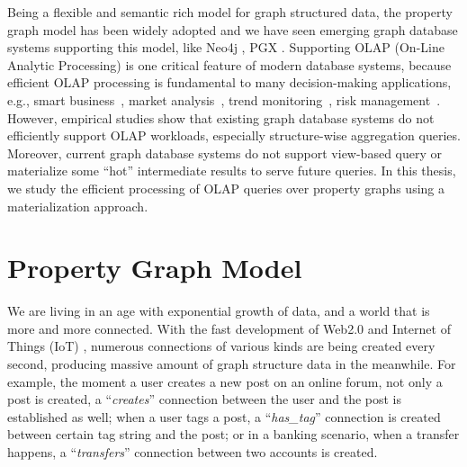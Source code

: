 

Being a flexible and semantic rich model for graph structured data, the property graph model has been widely adopted and we have seen emerging graph database systems supporting this model, like Neo4j \cite{DBLP:conf/oopsla/Webber12}, PGX \cite{DBLP:conf/sc/HongDMLVC15}. Supporting OLAP (On-Line Analytic Processing) is one critical feature of modern database systems, because efficient OLAP processing is fundamental to many decision-making applications, e.g., smart business~\cite{Petermann:2014:GDI:2733004.2733034}, market analysis~\cite{DBLP:journals/corr/LamSG16}, trend monitoring~\cite{DBLP:journals/tii/FangXZAPYL14}, risk management~\cite{DBLP:journals/tcyb/ChoiCY17}. However, empirical studies show that existing graph database systems do not efficiently support OLAP workloads, especially structure-wise aggregation queries. Moreover, current graph database systems do not support view-based query or materialize some ``hot'' intermediate results to serve future queries. In this thesis, we study the efficient processing of OLAP queries over property graphs  using a materialization approach.


\section{Property Graph Model}
\label{s:1}

We are living in an age with exponential growth of data, and a world that is more and more connected.  With the fast development of Web2.0 and Internet of Things (IoT) \cite{DBLP:journals/cacm/X17f}, numerous connections of various kinds are being created every second, producing massive amount of graph structure data in the meanwhile. For example, the moment a user creates a new post on an online forum, not only a post is created,  a ``\emph{creates}'' connection between the user and the post is established as well; when a user tags a post, a ``\emph{has\_tag}'' connection is created between certain tag string and the post; or in a banking scenario, when a transfer happens, a ``\emph{transfers}'' connection between two accounts is created.

